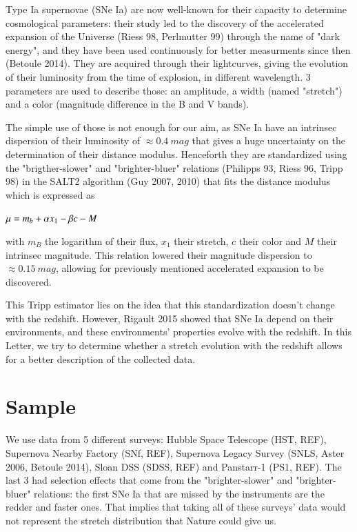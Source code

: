 \documentclass{aa}
\begin{document}
Type Ia supernovae (SNe Ia) are now well-known for their capacity to determine
cosmological parameters: their study led to the discovery of the accelerated
expansion of the Universe (Riess 98, Perlmutter 99) through the name of "dark
energy", and they have been used continuously for better measurments since then
(Betoule 2014). They are acquired through their lightcurves, giving the
evolution of their luminosity from the time of explosion, in different
wavelength. 3 parameters are used to describe those: an amplitude, a width
(named "stretch") and a color (magnitude difference in the B and V bands).

The simple use of those is not enough for our aim, as SNe Ia have an intrinsec
dispersion of their luminosity of $\approx \SI{0.4}{mag}$ that gives a huge
uncertainty on the determination of their distance modulus. Henceforth they are
standardized using the "brigther-slower" and "brighter-bluer" relations
(Philipps 93, Riess 96, Tripp 98) in the SALT2 algorithm (Guy 2007, 2010) that
fits the distance modulus which is expressed as
\begin{center}
    $ \displaystyle \mu = m_b + \alpha x_1 - \beta c - M$
\end{center}
with $m_B$ the logarithm of their flux, $x_1$ their stretch, $c$ their color and
$M$ their intrinsec magnitude. This relation lowered their magnitude dispersion
to $\approx \SI{0.15}{mag}$, allowing for previously mentioned accelerated
expansion to be discovered.

This Tripp estimator lies on the idea that this standardization doesn't change
with the redshift. However, Rigault 2015 showed that SNe Ia depend on their
environments, and these environments' properties evolve with the redshift. In
this Letter, we try to determine whether a stretch evolution with the redshift
allows for a better description of the collected data.

\section{Sample}\label{sec:sam}

We use data from 5 different surveys: Hubble Space Telescope (HST, REF),
Supernova Nearby Factory (SNf, REF), Supernova Legacy Survey (SNLS, Aster 2006,
Betoule 2014), Sloan DSS (SDSS, REF) and Panstarr-1 (PS1, REF). The last 3 had
selection effects that come from the "brighter-slower" and "brighter-bluer"
relations: the first SNe Ia that are missed by the instruments are the redder
and faster ones. That implies that taking all of these surveys' data would not
represent the stretch distribution that Nature could give us.
\end{document}
